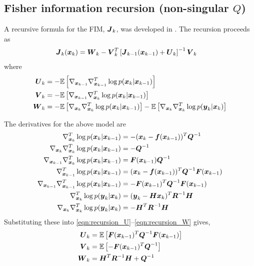 \documentclass{article}
\begin{document}
\subsection{Fisher information recursion (non-singular $Q$)} 
A recursive formula for the FIM, $\boldsymbol{J}_k$, was developed in \cite{Tichavsky1998}. The recursion proceeds as
\begin{align}
	\boldsymbol{J}_k({\boldsymbol x}_k) &= \boldsymbol{W}_k - \boldsymbol{V}_k^T\left[ \boldsymbol{J}_{k-1}({\boldsymbol x}_{k-1}) + \boldsymbol{U}_k\right]^{-1}\boldsymbol{V}_k 
\end{align}
where
\begin{align}
	\boldsymbol{U}_k &= -\mathbb E\left[ \nabla_{{\boldsymbol x}_{k-1}}\nabla_{{\boldsymbol x}_{k-1}}^T \log p({\boldsymbol x}_k|{\boldsymbol x}_{k-1}) \right] \label{eqn:recursion_U}\\
	\boldsymbol{V}_k &= -\mathbb E\left[ \nabla_{{\boldsymbol x}_{k-1}}\nabla_{{\boldsymbol x}_k}^T \log p({\boldsymbol x}_k|{\boldsymbol x}_{k-1}) \right] \label{eqn:recursion_V}\\
	\boldsymbol{W}_k &= -\mathbb E\left[ \nabla_{{\boldsymbol x}_k}\nabla_{{\boldsymbol x}_k}^T \log p({\boldsymbol x}_k|{\boldsymbol x}_{k-1}) \right] - \mathbb E\left[ \nabla_{{\boldsymbol x}_k}\nabla_{{\boldsymbol x}_k}^T \log p({\boldsymbol y}_k|{\boldsymbol x}_k) \right] \label{eqn:recursion_W}
\end{align}

The derivatives for the above model are
\begin{align}
	\nabla_{{\boldsymbol x}_k}^T \log p({\boldsymbol x}_k|{\boldsymbol x}_{k-1}) &= -({\boldsymbol x}_k - {\boldsymbol f}({\boldsymbol x}_{k-1}))^T\boldsymbol{Q}^{-1}  \\
	\nabla_{{\boldsymbol x}_k}\nabla_{{\boldsymbol x}_k}^T \log p({\boldsymbol x}_k|{\boldsymbol x}_{k-1}) &= -\boldsymbol{Q}^{-1} \\
	\nabla_{{\boldsymbol x}_{k-1}}\nabla_{{\boldsymbol x}_k}^T \log p({\boldsymbol x}_k|{\boldsymbol x}_{k-1}) &= \boldsymbol{F}({\boldsymbol x}_{k-1})\boldsymbol{Q}^{-1} \\
	\nabla_{{\boldsymbol x}_{k-1}}^T \log p({\boldsymbol x}_k|{\boldsymbol x}_{k-1}) &= ({\boldsymbol x}_k - {\boldsymbol f}({\boldsymbol x}_{k-1}))^T\boldsymbol{Q}^{-1} \boldsymbol{F}({\boldsymbol x}_{k-1}) \\
	\nabla_{{\boldsymbol x}_{k-1}}\nabla_{{\boldsymbol x}_{k-1}}^T \log p({\boldsymbol x}_k|{\boldsymbol x}_{k-1}) &= -\boldsymbol{F}({\boldsymbol x}_{k-1})^T\boldsymbol{Q}^{-1} \boldsymbol{F}({\boldsymbol x}_{k-1}) \\
	\nabla_{{\boldsymbol x}_k}^T \log p({\boldsymbol y}_k|{\boldsymbol x}_k) &= ({\boldsymbol y}_k - \boldsymbol{H}{\boldsymbol x}_k)^T\boldsymbol{R}^{-1} \boldsymbol{H} \\
	\nabla_{{\boldsymbol x}_k}\nabla_{{\boldsymbol x}_k}^T \log p({\boldsymbol y}_k|{\boldsymbol x}_k) &= -\boldsymbol{H}^T\boldsymbol{R}^{-1} \boldsymbol{H} 
\end{align}
Substituting these into \eqref{eqn:recursion_U}--\eqref{eqn:recursion_W} gives,
\begin{align}
	 \boldsymbol{U}_k &= \mathbb E\left[ \boldsymbol{F}({\boldsymbol x}_{k-1})^T\boldsymbol{Q}^{-1} \boldsymbol{F}({\boldsymbol x}_{k-1}) \right ] \label{eqn:pcrb_u} \\
	\boldsymbol{V}_k &= \mathbb E\left[ -\boldsymbol{F}({\boldsymbol x}_{k-1})^T\boldsymbol{Q}^{-1} \right ] \label{eqn:pcrb_v} \\
	\boldsymbol{W}_k &= \boldsymbol{H}^T\boldsymbol{R}^{-1}\boldsymbol{H} + \boldsymbol{Q}^{-1}
\end{align}
\end{document}
